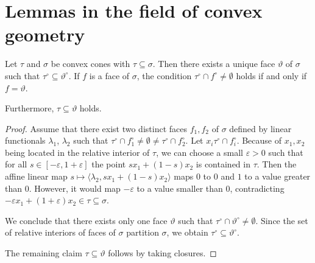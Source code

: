 \chapter{Lemmas in the field of convex geometry}

\begin{lemmaApp}
	\label{lemma:cones_in_cones}
	Let $\tau$ and $\sigma$ be convex cones with $\tau\subseteq \sigma$. Then there exists a unique face $\vartheta$ of $\sigma$ such that $\tau^\circ \subseteq \vartheta^\circ$. If $f$ is a face of $\sigma$, the condition $\tau^\circ \cap f^\circ \neq \emptyset$ holds if and only if $f=\vartheta$.
	
	Furthermore, $\tau \subseteq \vartheta$ holds.
\end{lemmaApp}
\begin{proof}
	Assume that there exist two distinct faces $f_1,f_2$ of $\sigma$ defined by linear functionals $\lambda_1$, $\lambda_2$ such that $\tau^\circ \cap f_1^\circ \neq \emptyset \neq \tau^\circ \cap f_2^\circ$. Let $x_i\tau^\circ \cap f_i^\circ$. Because of $x_1, x_2$ being located in the relative interior of $\tau$, we can choose a small $\varepsilon > 0$ such that for all $s\in[-\varepsilon,1+\varepsilon]$ the point $sx_1 + (1-s)x_2$ is contained in $\tau$. Then the affine linear map $s\mapsto \langle \lambda_2, sx_1 + (1-s)x_2\rangle$ maps $0$ to $0$ and $1$ to a value greater than $0$. However, it would map $-\varepsilon$ to a value smaller than $0$, contradicting $-\varepsilon x_1 + (1 + \varepsilon)x_2\in\tau\subseteq\sigma$.
	
	We conclude that there exists only one face $\vartheta$ such that $\tau^\circ \cap \vartheta^\circ \neq \emptyset$. Since the set of relative interiors of faces of $\sigma$ partition $\sigma$, we obtain $\tau^\circ \subseteq \vartheta^\circ$.
	
	The remaining claim $\tau \subseteq \vartheta$ follows by taking closures.
\end{proof}

